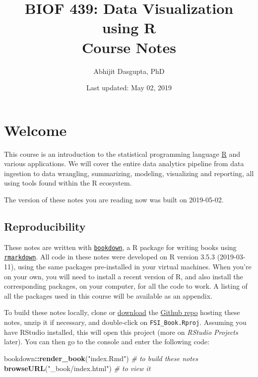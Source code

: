 \documentclass[12pt,letterpaperpaper,openany]{book}
\title{BIOF 439: Data Visualization using R\\
Course Notes}
\author{Abhijit Dasgupta, PhD}
\date{Last updated: May 02, 2019}
\newenvironment{Shaded}{\begin{snugshade}}{\end{snugshade}}
\newcommand{\CommentTok}[1]{\textcolor[rgb]{0.56,0.35,0.01}{\textit{#1}}}
\newcommand{\KeywordTok}[1]{\textcolor[rgb]{0.13,0.29,0.53}{\textbf{#1}}}
\newcommand{\NormalTok}[1]{#1}
\newcommand{\OperatorTok}[1]{\textcolor[rgb]{0.81,0.36,0.00}{\textbf{#1}}}
\newcommand{\StringTok}[1]{\textcolor[rgb]{0.31,0.60,0.02}{#1}}
\begin{document}
\maketitle

\hypertarget{welcome}{%
\chapter*{Welcome}\label{welcome}}

This course is an introduction to the statistical programming language
\href{http://www.r-project.org}{R} and various applications. We will cover the entire data analytics pipeline from data ingestion to data wrangling, summarizing, modeling, visualizing and reporting, all using tools found within the R ecosystem.

The version of these notes you are reading now was built on
2019-05-02.

\hypertarget{reproducibility}{%
\section*{Reproducibility}\label{reproducibility}}

These notes are written with \href{https://bookdown.org}{\texttt{bookdown}}, a R package for writing books using \href{https://rmarkdown.rstudio.com}{\texttt{rmarkdown}}.
All code in these notes were developed on R version 3.5.3 (2019-03-11), using
the same packages pre-installed in your virtual machines. When you're on your
own, you will need to install a recent version of R, and also install the
corresponding packages, on your computer, for all the code to work. A listing of
all the packages used in this course will be available as an appendix.

To build these notes locally, clone or \href{https://github.com/araastat/FSI_Book/archive/master.zip}{download} the
\href{https://github.com/araastat/FSI_Book}{Github repo} hosting these notes, unzip it if necessary, and double-click on \texttt{FSI\_Book.Rproj}. Assuming you have RStudio installed, this will open this project (more on \emph{RStudio Projects} later). You can then go to the console and enter the following code:

\begin{Shaded}
\begin{Highlighting}[]
\NormalTok{bookdown}\OperatorTok{::}\KeywordTok{render_book}\NormalTok{(}\StringTok{"index.Rmd"}\NormalTok{) }\CommentTok{# to build these notes}
\KeywordTok{browseURL}\NormalTok{(}\StringTok{"_book/index.html"}\NormalTok{) }\CommentTok{# to view it}
\end{Highlighting}
\end{Shaded}
\end{document}
